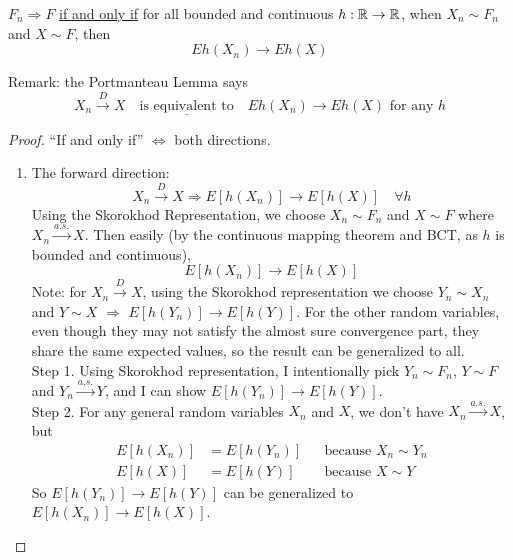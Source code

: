 \begin{theorem}
    $F_n \Rightarrow F$ \underline{if and only if} for all bounded and continuous $h: \mathbb{R} \to \mathbb{R}$, when $X_n \sim F_n$ and $X \sim F$, then
    \[Eh(X_n) \to Eh(X)\]
\end{theorem}
Remark: the Portmanteau Lemma says
\[X_n \overset{D}{\longrightarrow} X \quad \underline{\text{is equivalent to}} \quad Eh(X_n) \to Eh(X) \text{ for any } h\]
\begin{proof}
    ``If and only if'' $\Leftrightarrow$ both directions.
    \begin{enumerate}
        \item The forward direction:
        \[X_n \overset{D}{\longrightarrow} X \Rightarrow E[h(X_n)] \to E[h(X)] \quad \forall h\]
        Using the Skorokhod Representation, we choose $X_n \sim F_n$ and $X \sim F$ where $X_n \overset{a.s.}{\longrightarrow} X$. Then easily (by the continuous mapping theorem and BCT, as $h$ is bounded and continuous),
        \[E[h(X_n)] \to E[h(X)]\]
        Note: for $X_n \overset{D}{\longrightarrow} X$, using the Skorokhod representation we choose $Y_n \sim X_n$ and $Y \sim X$ $\Rightarrow$ $E[h(Y_n)] \to E[h(Y)]$. For the other random variables, even though they may not satisfy the almost sure convergence part, they share the same expected values, so the result can be generalized to all.
        \\Step 1. Using Skorokhod representation, I intentionally pick $Y_n \sim F_n$, $Y \sim F$ and $Y_n \overset{a.s.}{\longrightarrow} Y$, and I can show $E[h(Y_n)] \to E[h(Y)]$.
        \\Step 2. For any general random variables $X_n$ and $X$, we don't have $X_n \overset{a.s.}{\longrightarrow} X$, but
        \begin{align*}
            E[h(X_n)] &= E[h(Y_n)] & &\text{because } X_n \sim Y_n\\
            E[h(X)] &= E[h(Y)] & &\text{because } X \sim Y
        \end{align*}
        So $E[h(Y_n)] \to E[h(Y)]$ can be generalized to $E[h(X_n)] \to E[h(X)]$.


\end{enumerate}
\end{proof}
